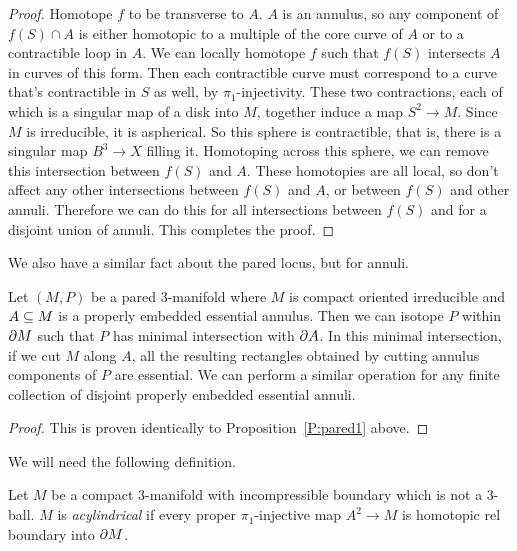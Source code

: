 \begin{proof}

Homotope $f$ to be transverse to $A$. $A$ is an annulus, so any component of
$f(S) \cap A$ is either homotopic to a multiple of the core curve of $A$ or to
a contractible loop in $A$. We can locally homotope $f$ such that $f(S)$
intersects $A$ in curves of this form.  Then each contractible curve must
correspond to a curve that's contractible in $S$ as well, by
$\pi_1$-injectivity. These two contractions, each of which is a singular map of
a disk into $M$, together induce a map $S^2 \to M$. Since $M$ is irreducible,
it is aspherical. So this sphere is contractible, that is, there is a singular
map $B^3 \to X$ filling it. Homotoping across this sphere, we can remove this
intersection between $f(S)$ and $A$. These homotopies are all local, so don't
affect any other intersections between $f(S)$ and $A$, or between $f(S)$ and
other annuli. Therefore we can do this for all intersections between $f(S)$ and
for a disjoint union of annuli. This completes the proof.

\end{proof}

We also have a similar fact about the pared locus, but for annuli.

\begin{prop}

Let $(M,P)$ be a pared $3$-manifold where $M$ is compact oriented irreducible
and $A \subseteq M$ is a properly embedded essential annulus. Then we can isotope
$P$ within $\partial M$ such that $P$ has minimal intersection with $\partial A$.  In
this minimal intersection, if we cut $M$ along $A$, all the resulting
rectangles obtained by cutting annulus components of $P$ are essential.  We can
perform a similar operation for any finite collection of disjoint properly
embedded essential annuli.

\end{prop}

\begin{proof}

This is proven identically to Proposition~\ref{P:pared1} above.

\end{proof}

We will need the following definition.

\begin{defn}

Let $M$ be a compact $3$-manifold with incompressible boundary which is not
a 3-ball.  $M$ is \emph{acylindrical} if every proper $\pi_1$-injective map
$A^2 \to M$ is homotopic rel boundary into $\partial M$.

\end{defn}

